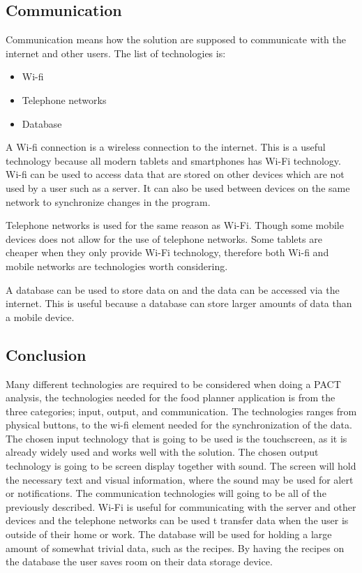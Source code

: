\subsection{Communication}
Communication means how the solution are supposed to communicate with the internet and other users. The list of technologies is:

\begin{itemize}
	\item Wi-fi
	\item Telephone networks
    \item Database
\end{itemize}

A Wi-fi connection is a wireless connection to the internet.
This is a useful technology because all modern tablets and smartphones has Wi-Fi technology.
Wi-fi can be used to access data that are stored on other devices which are not used by a user such as a server.
It can also be used between devices on the same network to synchronize changes in the program.    
%

Telephone networks is used for the same reason as Wi-Fi. Though some mobile devices does not allow for the use of telephone networks.
Some tablets are cheaper when they only provide Wi-Fi technology, therefore both Wi-fi and mobile networks are technologies worth considering.

A database can be used to store data on and the data can be accessed via the internet.
This is useful because a database can store larger amounts of data than a mobile device.
 
\subsection{Conclusion}
Many different technologies are required to be considered when doing a PACT analysis, the technologies needed for the food planner application is from the three categories; input, output, and communication.
The technologies ranges from physical buttons, to the wi-fi element needed for the synchronization of the data. The chosen input technology that is going to be used is the touchscreen, as it is already widely used and works well with the solution. The chosen output technology is going to be screen display together with sound. The screen will hold the necessary text and visual information, where the sound may be used for alert or notifications. The communication technologies will going to be all of the previously described. Wi-Fi is useful for communicating with the server and other devices and the telephone networks can be used t transfer data when the user is outside of their home or work. The database will be used for holding a large amount of somewhat trivial data, such as the recipes. By having the recipes on the database the user saves room on their data storage device.